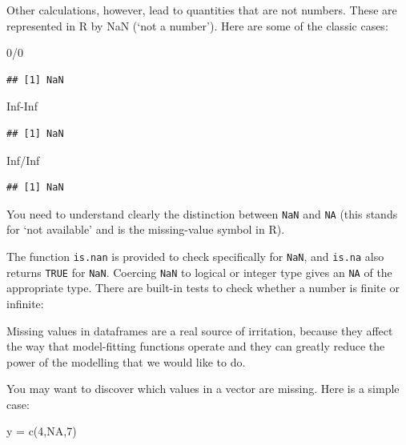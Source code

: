 \documentclass[
]{book}
\newenvironment{Shaded}{\begin{snugshade}}{\end{snugshade}}
\newcommand{\ConstantTok}[1]{\textcolor[rgb]{0.00,0.00,0.00}{#1}}
\newcommand{\DecValTok}[1]{\textcolor[rgb]{0.00,0.00,0.81}{#1}}
\newcommand{\FunctionTok}[1]{\textcolor[rgb]{0.00,0.00,0.00}{#1}}
\newcommand{\NormalTok}[1]{#1}
\newcommand{\OtherTok}[1]{\textcolor[rgb]{0.56,0.35,0.01}{#1}}
\newcommand{\SpecialCharTok}[1]{\textcolor[rgb]{0.00,0.00,0.00}{#1}}
\begin{document}
Other calculations, however, lead to quantities that are not numbers. These are represented in R by NaN (`not a number'). Here are some of the classic cases:

\begin{Shaded}
\begin{Highlighting}[]
\DecValTok{0}\SpecialCharTok{/}\DecValTok{0}
\end{Highlighting}
\end{Shaded}

\begin{verbatim}
## [1] NaN
\end{verbatim}

\begin{Shaded}
\begin{Highlighting}[]
\ConstantTok{Inf}\SpecialCharTok{{-}}\ConstantTok{Inf}
\end{Highlighting}
\end{Shaded}

\begin{verbatim}
## [1] NaN
\end{verbatim}

\begin{Shaded}
\begin{Highlighting}[]
\ConstantTok{Inf}\SpecialCharTok{/}\ConstantTok{Inf}
\end{Highlighting}
\end{Shaded}

\begin{verbatim}
## [1] NaN
\end{verbatim}

You need to understand clearly the distinction between \texttt{NaN} and \texttt{NA} (this stands for `not available' and is the missing-value symbol in R).

The function \texttt{is.nan} is provided to check specifically for \texttt{NaN}, and \texttt{is.na} also returns \texttt{TRUE} for \texttt{NaN}. Coercing \texttt{NaN} to logical or integer type gives an \texttt{NA} of the appropriate type. There are built-in tests to check whether a number is finite or infinite:

Missing values in dataframes are a real source of irritation, because they affect the way that model-fitting functions operate and they can greatly reduce the power of the modelling that we would like to do.

You may want to discover which values in a vector are missing. Here is a simple case:

\begin{Shaded}
\begin{Highlighting}[]
\NormalTok{y }\OtherTok{=} \FunctionTok{c}\NormalTok{(}\DecValTok{4}\NormalTok{,}\ConstantTok{NA}\NormalTok{,}\DecValTok{7}\NormalTok{)}
\end{Highlighting}
\end{Shaded}
\end{document}
